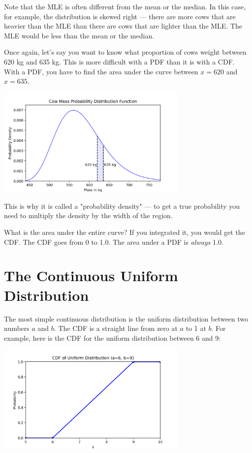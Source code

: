 Note that the MLE is often different from the mean or the median.  In this case, for example,  the distribution is skewed right --- there are more cows that are heavier than the 
MLE than there are cows that are lighter than the MLE. The MLE would be less than the mean or the median.

Once again,  let's say you want to know what proportion of cows weight between 620 kg and 635 kg. This is more difficult with a PDF than it is with a CDF.  With a PDF,  you have to find
the area under the curve between $x=620$ and $x=635$.  

\includegraphics[width=0.7\textwidth]{cow_pdf_bounds.png}

This is why it is called a "probability density" --- to get a true probability you need to multiply the density by the width of the region.

What is the area under the entire curve?  If you integrated it, you would get the CDF.  The CDF goes from 0 to 1.0.   The area under a PDF is \emph{always} 1.0.

\section{The Continuous Uniform Distribution}

The most simple continuous distribution is the uniform distribution between two numbers $a$ and $b$. The CDF is a straight line from zero at $a$ to 1 at $b$.  For example,
here is the CDF for the uniform distribution between 6 and 9:

\includegraphics[width=0.7\textwidth]{unif_cdf.png}

